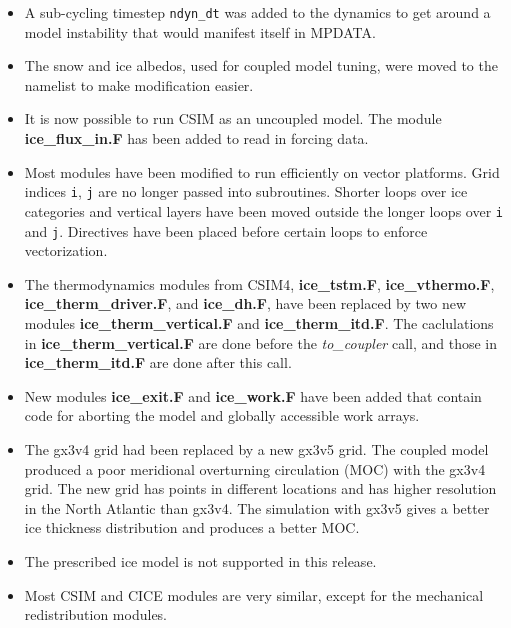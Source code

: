 \begin{itemize}
\item A sub-cycling timestep {\tt ndyn\_dt} was added to the dynamics to get around
      a model instability that would manifest itself in MPDATA.

\item The snow and ice albedos, used for coupled model tuning, were moved to the
      namelist to make modification easier.

\item It is now possible to run CSIM as an uncoupled model.  The module
      {\bf ice\_flux\_in.F} has been added to read in forcing data.

\item Most modules have been modified to run efficiently on vector platforms.
      Grid indices {\tt i}, {\tt j} are no longer passed into subroutines.  Shorter
      loops over ice categories and vertical layers have been moved outside
      the longer loops over {\tt i} and {\tt j}.  Directives have been placed
      before certain loops to enforce vectorization.

\item The thermodynamics modules from CSIM4, {\bf ice\_tstm.F}, {\bf ice\_vthermo.F},
      {\bf ice\_therm\_driver.F}, and {\bf ice\_dh.F}, have been replaced by two new
      modules {\bf ice\_therm\_vertical.F} and {\bf ice\_therm\_itd.F}.  The caclulations
      in {\bf ice\_therm\_vertical.F} are done before the {\it to\_coupler} call,
      and those in {\bf ice\_therm\_itd.F} are done after this call.

\item New modules {\bf ice\_exit.F} and {\bf ice\_work.F} have been added that
      contain code for aborting the model and globally accessible work arrays.

\item The gx3v4 grid had been replaced by a new gx3v5 grid. The coupled model
      produced a poor meridional overturning circulation (MOC) with the gx3v4 grid.
      The new grid has points in different locations and has higher resolution
      in the North Atlantic than gx3v4.  The simulation with gx3v5 gives a better ice
      thickness distribution and produces a better MOC.

\item The prescribed ice model is not supported in this release.

\item Most CSIM and CICE modules are very similar, except for the mechanical
      redistribution modules.

\end{itemize}

